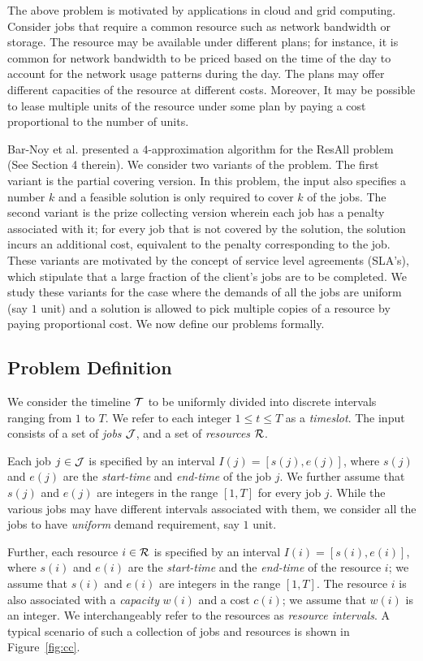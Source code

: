 \documentclass[11pt]{article}
\newcommand{\ResAll} {{\sc ResAll}}
\newcommand{\calI} {{\cal R}}
\newcommand{\cT} {{\cal T}}
\begin{document}
The above problem is motivated by applications in cloud and grid computing.
Consider jobs that require a common resource such as network bandwidth or storage.
The resource may be available under different plans; for instance, it is common for network bandwidth to be priced
based on the time of the day to account for the network usage patterns during the day. 
The plans may offer different capacities of the resource at different costs.
Moreover, It may be possible to lease multiple units of the resource under some plan by paying a cost
proportional to the number of units.

Bar-Noy et al. \cite{Bar-Noy} presented a $4$-approximation algorithm for the {\ResAll} problem
(See Section 4 therein).
We consider two variants of the problem.
The first variant is the partial covering version. In this problem, the input also specifies a number $k$ and
a feasible solution is only required to cover $k$ of the jobs.
The second variant is the prize collecting version wherein each job has a penalty associated with it;
for every job that is not covered by the solution, the solution incurs an additional cost, 
equivalent to the penalty corresponding to the job.
These variants are motivated by the concept of service level agreements (SLA's), 
which stipulate that a large fraction of the client's jobs are to be completed. 
We study these variants for the case where the demands of all the jobs are uniform (say $1$ unit)
and a solution is allowed to pick multiple copies of a resource by paying proportional cost.
We now define our problems formally.

\subsection{Problem Definition}
We consider the timeline $\cT$ to be uniformly divided into discrete intervals ranging from $1$ to $T$.
We refer to each integer $1\leq t\leq T$ as a {\it timeslot}.
The input consists of a set of  {\em jobs} ${\cal J}$, and a set of {\em resources} $\calI$.

Each job $j \in {\cal J}$ is specified by an interval $I(j) = [s(j), e(j)]$, where $s(j)$ and $e(j)$ are the {\em start-time} and {\em end-time}
of the job $j$. We further assume that $s(j)$ and $e(j)$ are integers in the range $[1, T]$ for every job $j$.
While the various jobs may have different intervals associated with them, we consider all the jobs to have
{\em uniform} demand requirement, say $1$ unit. 

Further, each resource $i \in \calI$ is specified
by an interval $I(i)=[s(i),e(i)]$, where $s(i)$ and $e(i)$ are the {\em start-time} and the {\em end-time}
of the resource $i$; we assume that $s(i)$ and $e(i)$ are integers in the range $[1,T]$. 
The resource $i$ is also associated with a {\em capacity} $w(i)$ and a cost $c(i)$; we
assume that $w(i)$ is an integer. 
We interchangeably refer to the resources as {\em resource intervals}.
A typical scenario of such a collection of jobs and resources is shown in Figure~\ref{fig:cc}.
\end{document}
